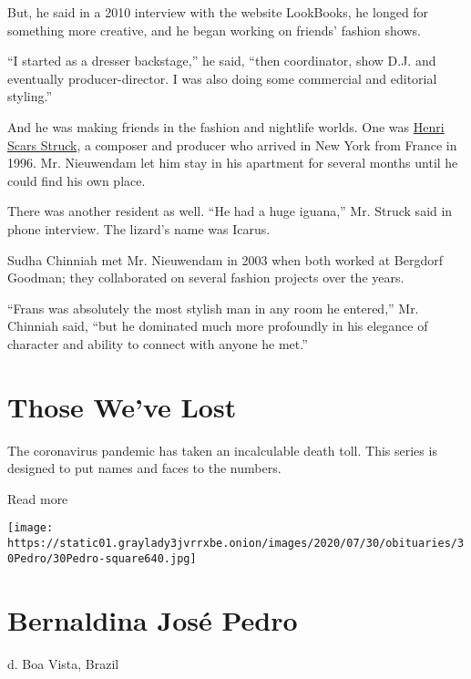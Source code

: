 But, he said in a 2010 interview with the website LookBooks, he longed
for something more creative, and he began working on friends' fashion
shows.

``I started as a dresser backstage,'' he said, ``then coordinator, show
D.J. and eventually producer-director. I was also doing some commercial
and editorial styling.''

And he was making friends in the fashion and nightlife worlds. One was
\href{https://www.henriscarsstruck.com/about}{Henri Scars Struck}, a
composer and producer who arrived in New York from France in 1996. Mr.
Nieuwendam let him stay in his apartment for several months until he
could find his own place.

There was another resident as well. ``He had a huge iguana,'' Mr. Struck
said in phone interview. The lizard's name was Icarus.

Sudha Chinniah met Mr. Nieuwendam in 2003 when both worked at Bergdorf
Goodman; they collaborated on several fashion projects over the years.

``Frans was absolutely the most stylish man in any room he entered,''
Mr. Chinniah said, ``but he dominated much more profoundly in his
elegance of character and ability to connect with anyone he met.''

\href{https://www.nytimes3xbfgragh.onion/interactive/2020/obituaries/people-died-coronavirus-obituaries.html?action=click\&pgtype=Article\&state=default\&region=BELOW_MAIN_CONTENT\&context=covid_obits_promo}{}

\hypertarget{those-weve-lost}{%
\section{Those We've Lost}\label{those-weve-lost}}

The coronavirus pandemic has taken an incalculable death toll. This
series is designed to put names and faces to the numbers.

Read more

\texttt{[image: https://static01.graylady3jvrrxbe.onion/images/2020/07/30/obituaries/30Pedro/30Pedro-square640.jpg]}

\hypertarget{bernaldina-josuxe9-pedro}{%
\section{Bernaldina José Pedro}\label{bernaldina-josuxe9-pedro}}

d. Boa Vista, Brazil

